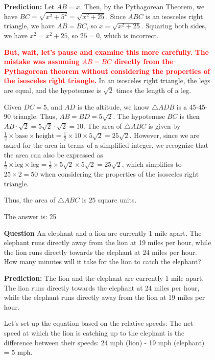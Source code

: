 \begin{figure}
\begin{tcolorbox}[boxrule=0.5mm, left=1mm, right=1mm, top=1mm, bottom=1mm,title=\textbf{Example 1}]
        \textbf{Prediction:} 
        Let $AB = x$.  Then, by the Pythagorean Theorem, we have $BC = \sqrt{x^2 + 5^2} = \sqrt{x^2 + 25}$.  Since $ABC$ is an isosceles right triangle, we have $AB = BC$, so $x = \sqrt{x^2 + 25}$.  Squaring both sides, we have $x^2 = x^2 + 25$, so $25 = 0$, which is incorrect. 
        
        \textcolor{red}{\textbf{But, wait, let's pause and examine this more carefully. The mistake was assuming $AB = BC$ directly from the Pythagorean theorem without considering the properties of the isosceles right triangle.}} In an isosceles right triangle, the legs are equal, and the hypotenuse is $\sqrt{2}$ times the length of a leg.
        
        Given $DC = 5$, and $AD$ is the altitude, we know $\triangle ADB$ is a 45-45-90 triangle. Thus, $AB = BD = 5\sqrt{2}$. The hypotenuse $BC$ is then $AB \cdot \sqrt{2} = 5\sqrt{2} \cdot \sqrt{2} = 10$.
        The area of $\triangle ABC$ is given by $\frac{1}{2} \times \text{base} \times \text{height} = \frac{1}{2} \times 10 \times 5\sqrt{2} = 25\sqrt{2}$. However, since we are asked for the area in terms of a simplified integer, we recognize that the area can also be expressed as $\frac{1}{2} \times \text{leg} \times \text{leg} = \frac{1}{2} \times 5\sqrt{2} \times 5\sqrt{2} = 25\sqrt{2}$, which simplifies to $25 \times 2 = 50$ when considering the properties of the isosceles right triangle.
        
        Thus, the area of $\triangle ABC$ is $\boxed{25}$ square units.
        
        The answer is: 25

    \end{tcolorbox}

    \begin{tcolorbox}[boxrule=0.5mm, left=1mm, right=1mm, top=1mm, bottom=1mm,title=\textbf{Example 2}]
        \textbf{Question}
        An elephant and a lion are currently 1 mile apart. The elephant runs directly away from the lion at 19 miles per hour, while the lion runs directly towards the elephant at 24 miles per hour.  How many minutes will it take for the lion to catch the elephant?

        \textbf{Prediction:} 
        The lion and the elephant are currently 1 mile apart. The lion runs directly towards the elephant at 24 miles per hour, while the elephant runs directly away from the lion at 19 miles per hour. 
        
        Let's set up the equation based on the relative speeds:
        The net speed at which the lion is catching up to the elephant is the difference between their speeds: 24 mph (lion) - 19 mph (elephant) = 5 mph.
        

\end{tcolorbox}
\end{figure}
